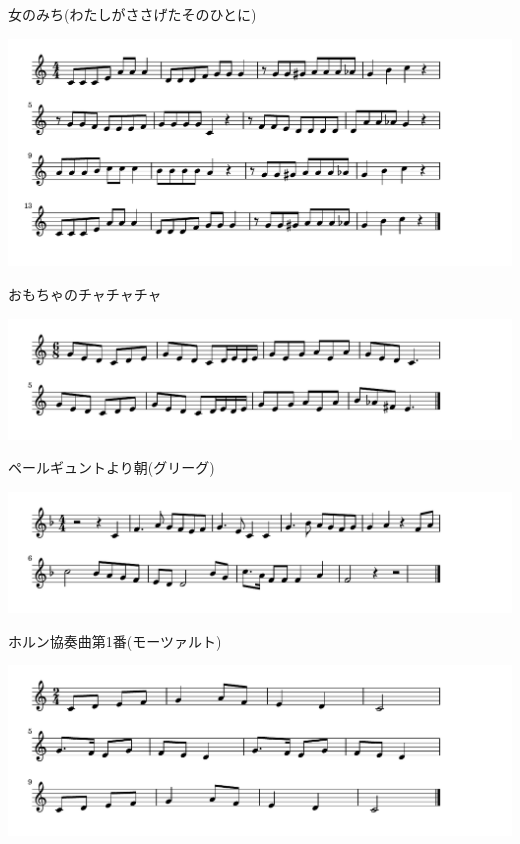 \documentclass[a4paper]{ltjsarticle}
\begin{document}
\vspace{-10mm} \hspace{10mm}
女のみち(わたしがささげたそのひとに)


\includegraphics[clip]{omochanochachacha_crop.pdf}

\vspace{-10mm} \hspace{10mm}
おもちゃのチャチャチャ

\includegraphics[clip]{peergyntasagrieg_crop.pdf}

\vspace{-10mm} \hspace{10mm}
ペールギュントより朝(グリーグ)

\includegraphics[clip]{hornmozart_crop.pdf}

\vspace{-10mm} \hspace{10mm}
ホルン協奏曲第1番(モーツァルト)

\includegraphics[clip]{ikenoame_crop.pdf}
\end{document}
